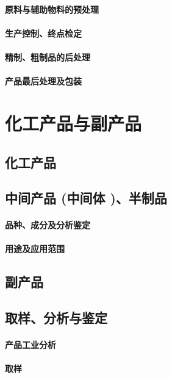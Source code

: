 \documentclass[UTF8]{../../ApplicationUniverse}
\begin{document}
    \subsubsection{原料与辅助物料的预处理}
\subsubsection{生产控制、终点检定}
\subsubsection{精制、粗制品的后处理}
\subsubsection{产品最后处理及包装}


    



\chapter{化工产品与副产品}
\section{化工产品}
\section{中间产品 (中间体 )、半制品}
    \subsubsection{品种、成分及分析鉴定}
    \subsubsection{用途及应用范围}
\section{副产品}
\section{取样、分析与鉴定}
    \subsubsection{产品工业分析}
    \subsubsection{取样}
\end{document}
